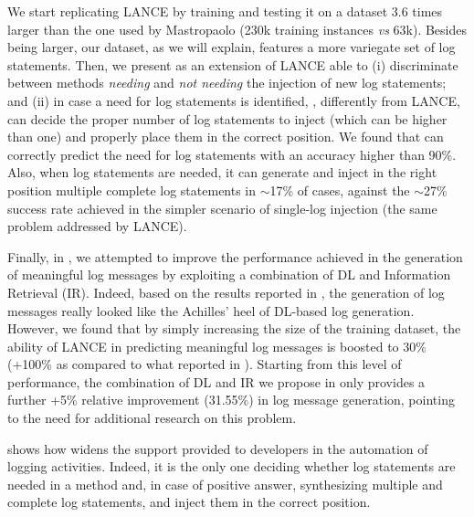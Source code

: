 We start replicating LANCE by training and testing it on a dataset 3.6 times larger than the one used by Mastropaolo \etal \cite{mastropaolo2022using} (230k training instances \emph{vs} 63k). Besides being larger, our dataset, as we will explain, features a more variegate set of log statements. Then, we present \approach as an extension of LANCE able to (i) discriminate between methods \emph{needing} and \emph{not needing} the injection of new log statements; and (ii) in case a need for log statements is identified, \approach, differently from LANCE, can decide the proper number of log statements to inject (which can be higher than one) and properly place them in the correct position. We found that \approach can correctly predict the need for log statements with an accuracy higher than 90\%. Also, when log statements are needed, it can generate and inject in the right position multiple complete log statements in $\sim$17\% of cases, against the $\sim$27\% success rate achieved in the simpler scenario of single-log injection (\ie the same problem addressed by LANCE).   

Finally, in \approach, we attempted to improve the performance achieved in the generation of meaningful log messages by exploiting a combination of DL and Information Retrieval (IR). Indeed, based on the results reported in \cite{mastropaolo2022using}, the generation of log messages really looked like the Achilles' heel of DL-based log generation. However, we found that by simply increasing the size of the training dataset, the ability of LANCE in predicting meaningful log messages is boosted to 30\% (+100\% as compared to what reported in \cite{mastropaolo2022using}). Starting from this level of performance, the combination of DL and IR we propose in \approach only provides a further +5\% relative improvement (31.55\%) in log message generation, pointing to the need for additional research on this problem.

 shows how \approach widens the support provided to developers in the automation of logging activities. Indeed, it is the only one deciding whether log statements are needed in a method and, in case of positive answer, synthesizing multiple and complete log statements, and inject them in the correct position. 

